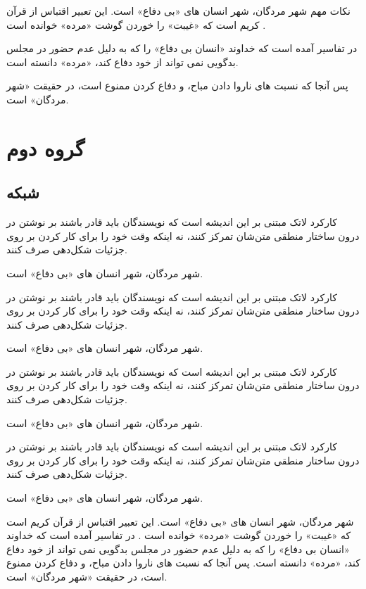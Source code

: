 \documentclass{report}
\begin{document}
\begin{goal}{نکات مهم}
شهر مردگان، شهر انسان های «بی دفاع» است. این تعبیر اقتباس از قرآن کریم است که «غیبت» را خوردن گوشت «مرده» خوانده است . 

در تفاسیر آمده است که خداوند «انسان بی دفاع» را که به دلیل عدم حضور در مجلس بدگویی نمی تواند از خود دفاع کند، «مرده» دانسته است.

  پس آنجا که نسبت های ناروا دادن مباح، و دفاع کردن ممنوع است، در حقیقت «شهر مردگان» است.
\end{goal}

\chapter{گروه دوم}
\section{شبکه}
کارکرد لاتک مبتنی بر این اندیشه است که نویسندگان باید قادر باشند بر نوشتن در درون ساختار منطقی متن‌شان تمرکز کنند، نه اینکه وقت خود را برای کار کردن بر روی جزئیات شکل‌دهی صرف کنند. 
\begin{ntdefinition}
شهر مردگان، شهر انسان های «بی دفاع» است. 
\end{ntdefinition}
کارکرد لاتک مبتنی بر این اندیشه است که نویسندگان باید قادر باشند بر نوشتن در درون ساختار منطقی متن‌شان تمرکز کنند، نه اینکه وقت خود را برای کار کردن بر روی جزئیات شکل‌دهی صرف کنند. 
\begin{ntdefinition}
شهر مردگان، شهر انسان های «بی دفاع» است. 
\end{ntdefinition}
کارکرد لاتک مبتنی بر این اندیشه است که نویسندگان باید قادر باشند بر نوشتن در درون ساختار منطقی متن‌شان تمرکز کنند، نه اینکه وقت خود را برای کار کردن بر روی جزئیات شکل‌دهی صرف کنند. 
\begin{ntexample}
شهر مردگان، شهر انسان های «بی دفاع» است. 
\end{ntexample}
کارکرد لاتک مبتنی بر این اندیشه است که نویسندگان باید قادر باشند بر نوشتن در درون ساختار منطقی متن‌شان تمرکز کنند، نه اینکه وقت خود را برای کار کردن بر روی جزئیات شکل‌دهی صرف کنند. 
\begin{ntexample}
شهر مردگان، شهر انسان های «بی دفاع» است. 
\end{ntexample}
\begin{ntsolution}
شهر مردگان، شهر انسان های «بی دفاع» است. این تعبیر اقتباس از قرآن کریم است که «غیبت» را خوردن گوشت «مرده» خوانده است . در تفاسیر آمده است که خداوند «انسان بی دفاع» را که به دلیل عدم حضور در مجلس بدگویی نمی تواند از خود دفاع کند، «مرده» دانسته است. پس آنجا که نسبت های ناروا دادن مباح، و دفاع کردن ممنوع است، در حقیقت «شهر مردگان» است.
\end{ntsolution}
\end{document}
